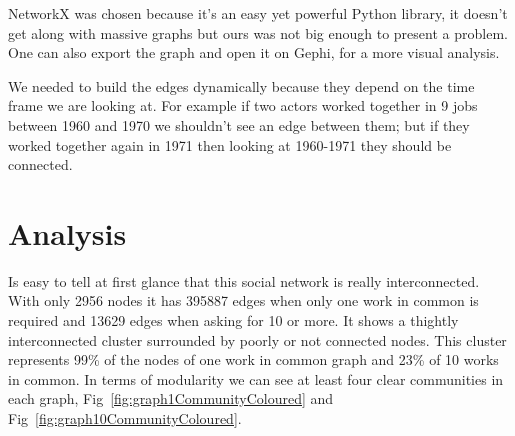 NetworkX was chosen because it's an easy yet powerful Python library, it doesn't get along with massive graphs but ours was not big enough to present a problem. One can also export the graph and open it on Gephi, for a more visual analysis.

We needed to build the edges dynamically because they depend on the time frame we are looking at. For example if two actors worked together in 9 jobs between 1960 and 1970 we shouldn't see an edge between them; but if they worked together again in 1971 then looking at 1960-1971 they should be connected.

\section{Analysis}
Is easy to tell at first glance that this social network is really interconnected. With only 2956 nodes it has 395887 edges when only one work in common is required and 13629 edges when asking for 10 or more. It shows a thightly interconnected cluster surrounded by poorly or not connected nodes. This cluster represents 99\% of the nodes of one work in common graph and 23\% of 10 works in common. In terms of modularity we can see at least four clear communities in each graph, Fig~\ref{fig:graph1CommunityColoured} and Fig~\ref{fig:graph10CommunityColoured}.

